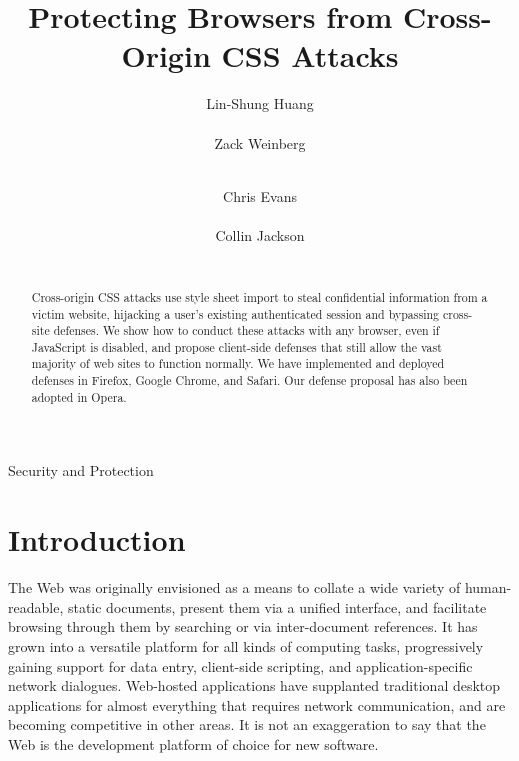 \documentclass{acm_proc_article-sp}
\begin{document}
\title{Protecting Browsers from Cross-Origin CSS Attacks}
\author{
\alignauthor
Lin-Shung Huang\\
      \\
\alignauthor
Zack Weinberg\\
      \\
\and
\alignauthor
Chris Evans\\
      \\
\alignauthor
Collin Jackson\\
      \\
}

\newcommand{\todo}[1]{\textbf{[TODO: #1]}}

\maketitle
\begin{abstract}
Cross-origin CSS attacks use style sheet import to steal confidential
information from a victim website, hijacking a user's existing
authenticated session and bypassing cross-site defenses.  We show how
to conduct these attacks with any browser, even if JavaScript is
disabled, and propose client-side defenses that still allow the vast
majority of web sites to function normally. We have implemented and
deployed defenses in Firefox, Google Chrome, and Safari. Our defense
proposal has also been adopted in Opera.
\end{abstract}

                {Security and Protection}



\section{Introduction}

The Web was originally envisioned \cite{wwwproposal} as a means to
collate a wide variety of human-readable, static documents, present
them via a unified interface, and facilitate browsing through them by
searching or via inter-document references. It has grown into a
versatile platform for all kinds of computing tasks, progressively
gaining support for data entry, client-side scripting, and
application-specific network dialogues.  Web-hosted applications have
supplanted traditional desktop applications for almost everything that
requires network communication, and are becoming competitive in other
areas.  It is not an exaggeration to say that the Web is the
development platform of choice for new software.
\end{document}
